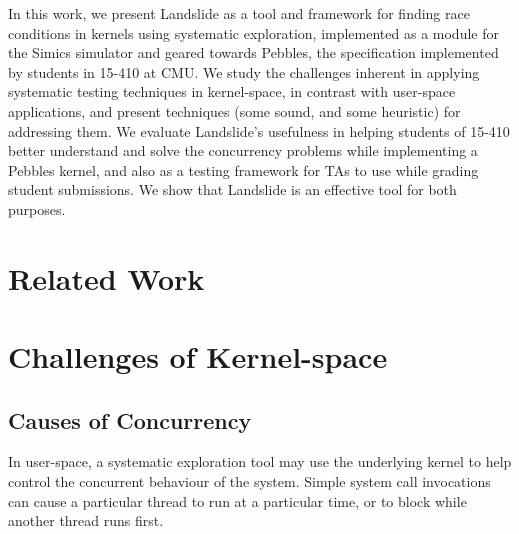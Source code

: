 \documentclass[10pt,twocolumn]{article}
\begin{document}
In this work, we present Landslide as a tool and framework for finding race conditions in kernels using systematic exploration, implemented as a module for the Simics simulator and geared towards Pebbles, the specification implemented by students in 15-410 at CMU.
We study the challenges inherent in applying systematic testing techniques in kernel-space, in contrast with user-space applications, and present techniques (some sound, and some heuristic) for addressing them.
We evaluate Landslide's usefulness in helping students of 15-410 better understand and solve the concurrency problems while implementing a Pebbles kernel, and also as a testing framework for TAs to use while grading student submissions.
We show that Landslide is an effective tool for both purposes.

\section{Related Work}

\section{Challenges of Kernel-space}

\subsection{Causes of Concurrency}

In user-space, a systematic exploration tool may use the underlying kernel to help control the concurrent behaviour of the system. Simple system call invocations can cause a particular thread to run at a particular time, or to block while another thread runs first.
\end{document}
